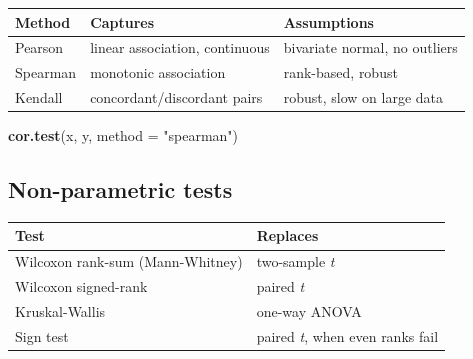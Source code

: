 \documentclass[
]{article}
\newenvironment{Shaded}{\begin{snugshade}}{\end{snugshade}}
\newcommand{\AttributeTok}[1]{\textcolor[rgb]{0.13,0.29,0.53}{#1}}
\newcommand{\FunctionTok}[1]{\textcolor[rgb]{0.13,0.29,0.53}{\textbf{#1}}}
\newcommand{\NormalTok}[1]{#1}
\newcommand{\StringTok}[1]{\textcolor[rgb]{0.31,0.60,0.02}{#1}}
\newcounter{none} %
\begin{document}
{\def\LTcaptype{none} %
\begin{longtable}[]{@{}
  >{\raggedright\arraybackslash}p{}
  >{\raggedright\arraybackslash}p{}
  >{\raggedright\arraybackslash}p{}@{}}
\toprule\noalign{}
\begin{minipage}[b]{\linewidth}\raggedright
Method
\end{minipage} & \begin{minipage}[b]{\linewidth}\raggedright
Captures
\end{minipage} & \begin{minipage}[b]{\linewidth}\raggedright
Assumptions
\end{minipage} \\
\midrule\noalign{}
\endhead
\bottomrule\noalign{}
\endlastfoot
Pearson & linear association, continuous & bivariate normal, no
outliers \\
Spearman & monotonic association & rank-based, robust \\
Kendall & concordant/discordant pairs & robust, slow on large data \\
\end{longtable}
}

\begin{Shaded}
\begin{Highlighting}[]
\FunctionTok{cor.test}\NormalTok{(x, y, }\AttributeTok{method =} \StringTok{"spearman"}\NormalTok{)}
\end{Highlighting}
\end{Shaded}

\subsection{Non-parametric tests}\label{non-parametric-tests}

{\def\LTcaptype{none} %
\begin{longtable}[]{@{}ll@{}}
\toprule\noalign{}
Test & Replaces \\
\midrule\noalign{}
\endhead
\bottomrule\noalign{}
\endlastfoot
Wilcoxon rank-sum (Mann-Whitney) & two-sample \emph{t} \\
Wilcoxon signed-rank & paired \emph{t} \\
Kruskal-Wallis & one-way ANOVA \\
Sign test & paired \emph{t}, when even ranks fail \\
\end{longtable}
}
\end{document}
